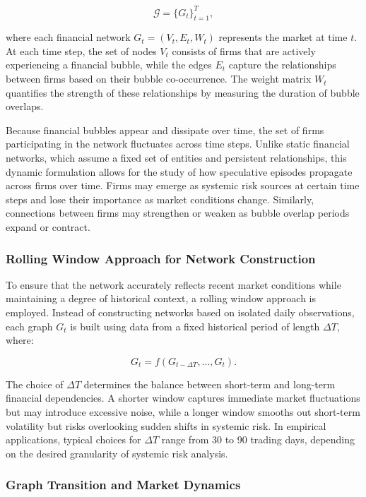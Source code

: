 \documentclass[preprint,12pt,authoryear]{elsarticle}
\begin{document}
\[
\mathcal{G} = \{ G_t \}_{t=1}^{T},
\]

where each financial network \( G_t = (V_t, E_t, W_t) \) represents the market at time \( t \). At each time step, the set of nodes \( V_t \) consists of firms that are actively experiencing a financial bubble, while the edges \( E_t \) capture the relationships between firms based on their bubble co-occurrence. The weight matrix \( W_t \) quantifies the strength of these relationships by measuring the duration of bubble overlaps.  

Because financial bubbles appear and dissipate over time, the set of firms participating in the network fluctuates across time steps. Unlike static financial networks, which assume a fixed set of entities and persistent relationships, this dynamic formulation allows for the study of how speculative episodes propagate across firms over time. Firms may emerge as systemic risk sources at certain time steps and lose their importance as market conditions change. Similarly, connections between firms may strengthen or weaken as bubble overlap periods expand or contract.

\subsubsection{Rolling Window Approach for Network Construction}  

To ensure that the network accurately reflects recent market conditions while maintaining a degree of historical context, a rolling window approach is employed. Instead of constructing networks based on isolated daily observations, each graph \( G_t \) is built using data from a fixed historical period of length \( \Delta T \), where:

\[
G_t = f(G_{t - \Delta T}, ..., G_t).
\]

The choice of \( \Delta T \) determines the balance between short-term and long-term financial dependencies. A shorter window captures immediate market fluctuations but may introduce excessive noise, while a longer window smooths out short-term volatility but risks overlooking sudden shifts in systemic risk. In empirical applications, typical choices for \( \Delta T \) range from 30 to 90 trading days, depending on the desired granularity of systemic risk analysis.

\subsubsection{Graph Transition and Market Dynamics}  
\end{document}
